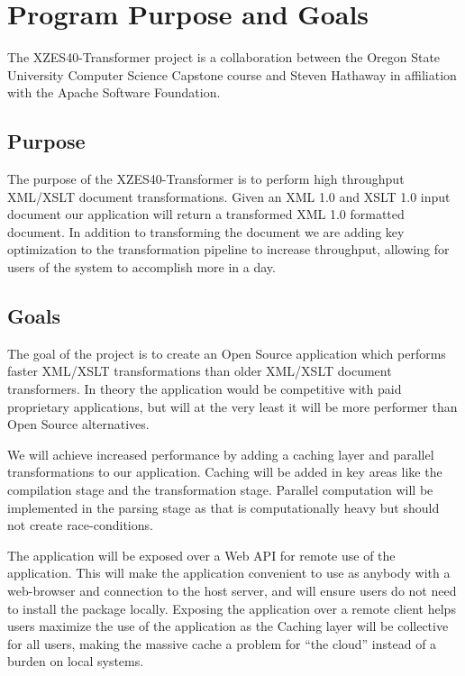 \clearpage

\section{Program Purpose and Goals}

The XZES40-Transformer project is a collaboration between the Oregon State University Computer Science Capstone course and Steven Hathaway in affiliation with the Apache Software Foundation.

\subsection{Purpose}

The purpose of the XZES40-Transformer is to perform high throughput XML/XSLT document transformations. 
Given an XML 1.0 and XSLT 1.0 input document our application will return a transformed XML 1.0 formatted document.
In addition to transforming the document we are adding key optimization to the transformation pipeline to increase throughput, allowing for users of the system to accomplish more in a day.

\subsection{Goals}

The goal of the project is to create an Open Source application which performs faster XML/XSLT transformations than older XML/XSLT document transformers.
In theory the application would be competitive with paid proprietary applications, but will at the very least it will be more performer than Open Source alternatives.

We will achieve increased performance by adding a caching layer and parallel transformations to our application.
Caching will be added in key areas like the compilation stage and the transformation stage.
Parallel computation will be implemented in the parsing stage as that is computationally heavy but should not create race-conditions.

The application will be exposed over a Web API for remote use of the application.
This will make the application convenient to use as anybody with a web-browser and connection to the host server, and will ensure users do not need to install the package locally.
Exposing the application over a remote client helps users maximize the use of the application as the Caching layer will be collective for all users, making the massive cache a problem for ``the cloud'' instead of a burden on local systems.

